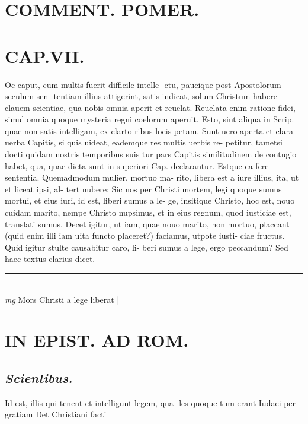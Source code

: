 \documentclass{article}
\begin{document}
\begin{pages}
\section*{COMMENT. POMER.  }
\endnumbering\beginnumbering\section{CAP.VII.}\pstart \huge\textbf{}\normalsize Oc caput, cum multis fuerit difficile intelle- ctu, paucique post Apostolorum seculum sen- tentiam illius attigerint, satis indicat, solum Christum habere clauem scientiae, qua nobis omnia aperit et reuelat. Reuelata enim ratione fidei, simul omnia quoque mysteria regni coelorum aperuit. Esto, sint aliqua in Scrip. quae non satis intelligam, ex clarto ribus locis petam. Sunt uero aperta et clara uerba Capitis, si quis uideat, eademque res multis uerbis re- petitur, tametsi docti quidam nostris temporibus suis tur pars Capitis similitudinem de contugio habet, qua, quae dicta sunt in superiori Cap. declarantur. Estque ea fere sententia. Quemadmodum mulier, mortuo ma- rito, libera est a iure illius, ita, ut et liceat ipsi, al- tert nubere: Sic nos per Christi mortem, legi quoque  sumus mortui, et eius iuri, id est, liberi sumus a le- ge, insitique Christo, hoc est, nouo cuidam marito, nempe Christo nupsimus, et in eius regnum, quod iusticiae est, translati sumus. Decet igitur, ut iam, quae nouo marito, non mortuo, placcant (quid enim illi iam uita functo placeret?) faciamus, utpote iusti- ciae fructus. Quid igitur stulte causabitur caro, li- beri sumus a lege, ergo peccandum? Sed haec textus clarius dicet.  \pend
\vspace{0.5cm}\noindent
\vspace{0.2cm}\rule{1cm}{0.2pt}\\ 
\hspace{0.2cm}\textit{mg}
\footnotesize Mors Christi a lege liberat 
\normalsize| 
\section*{IN EPIST. AD ROM.  }
\marginpar{[ p.68 ]}
{}
\subsection*{\textit{Scientibus. }}\pstart Id est, illis qui tenent et intelligunt legem, qua- les quoque tum erant Iudaei per gratiam Det Christiani facti  \pend
{}
{}

\end{pages}
\end{document}
